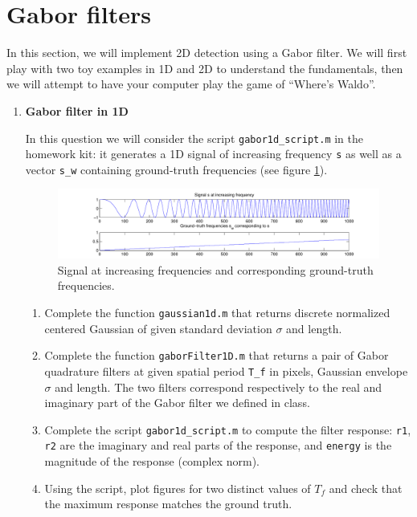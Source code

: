 \section{Gabor filters}
In this section, we will implement 2D detection using a Gabor filter. We will first play with two toy examples in 1D and 2D to understand the fundamentals, then we will attempt to have your computer play the game of ``Where's Waldo''.


\begin{enumerate}
\item \textbf{Gabor filter in 1D}

  In this question we will consider the script \verb!gabor1d_script.m! in the homework kit: it generates a 1D signal of increasing frequency \verb!s! as well as a vector \verb!s_w! containing ground-truth frequencies (see figure \ref{incr_freq}).
  \begin{figure}[ht!]
    \begin{center}
      \includegraphics[width = \textwidth]{images/incr_freq_signal.pdf}
    \end{center}
    \caption{\label{incr_freq} Signal at increasing frequencies and corresponding ground-truth frequencies.}
  \end{figure}

  \begin{enumerate}
  \item {} Complete the function \verb!gaussian1d.m! that returns discrete normalized centered Gaussian of given standard deviation $\sigma$ and length.
  \item {} Complete the function \verb!gaborFilter1D.m! that returns a pair of Gabor quadrature filters at given spatial period \verb!T_f! in pixels, Gaussian envelope $\sigma$ and length. The two filters correspond respectively to the real and imaginary part of the Gabor filter we defined in class.
  \item {} Complete the script \verb!gabor1d_script.m! to compute the filter response: \verb!r1!, \verb!r2! are the imaginary and real parts of the response, and \verb!energy! is the magnitude of the response (complex norm).
  \item {} Using the script, plot figures for two distinct values of $T_f$ and check that the maximum response matches the ground truth.
  \end{enumerate}


\end{enumerate}
